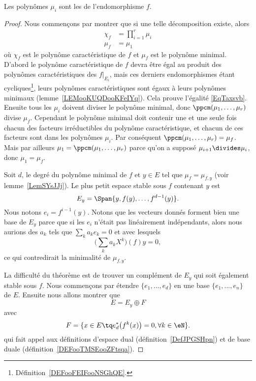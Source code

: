 Les polynômes \( \mu_i\) sont les  de l'endomorphisme \( f\).

\begin{proof}
	Nous commençons par montrer que si une telle décomposition existe, alors
	\begin{subequations}    \label{subEqzcGouz}
		\begin{align}
			\chi_f & =\prod_{i=1}^r\mu_i   \label{EqTaxsvb} \\
			\mu_f  & =\mu_1
		\end{align}
	\end{subequations}
	où \( \chi_f\) est le polynôme caractéristique de \( f\) et \( \mu_f\) est le polynôme minimal. D'abord le polynôme caractéristique de \( f\) devra être égal au produit des polynômes caractéristiques des \( f|_{E_i}\), mais ces derniers endomorphismes étant cycliques\footnote{Définition~\ref{DEFooFEIFooNSGhQE}.}, leurs polynômes caractéristiques sont égaux à leurs polynômes minimaux (lemme~\ref{LEMooKUQDooKFeIYq}). Cela prouve l'égalité \eqref{EqTaxsvb}. Ensuite tous les \( \mu_i\) doivent diviser le polynôme minimal, donc \( \ppcm(\mu_1,\ldots, \mu_r)\) divise \(\mu_f\). Cependant le polynôme minimal doit contenir une et une seule fois chacun des facteurs irréductibles du polynôme caractéristique, et chacun de ces facteurs sont dans les polynômes \( \mu_i\). Par conséquent \( \ppcm(\mu_1,\ldots, \mu_r)=\mu_f\). Mais par ailleurs \( \mu_1=\ppcm(\mu_1,\ldots, \mu_r)\) parce qu'on a supposé \( \mu_{i+1}\divides \mu_i\), donc \( \mu_1=\mu_f\).

	Soit \( d\), le degré du polynôme minimal de \( f\) et \( y\in E\) tel que \( \mu_f=\mu_{f,y}\) (voir lemme~\ref{LemSYsJJj}). Le plus petit espace stable sous \( f\) contenant \( y\) est
	\begin{equation}
		E_y=\Span\{ y,f(y),\ldots, f^{d-1}(y) \}.
	\end{equation}
	Nous notons \( e_i=f^{i-1}(y)\). Notons que les vecteurs donnés forment bien une base de \( E_y\) parce que si les \( e_i\) n'était pas linéairement indépendants, alors nous aurions des \( a_k\) tels que \( \sum_ka_ke_k=0\) et avec lesquels
	\begin{equation}
		\big( \sum_ka_kX^k \big)(f)y=0,
	\end{equation}
	ce qui contredirait la minimalité de \( \mu_{f,y}\).

	La difficulté du théorème est de trouver un complément de \( E_y\) qui soit également stable sous \( f\). Nous commençons par étendre \( \{ e_1,\ldots, e_d \}\) en une base \( \{ e_1,\ldots, e_n \}\) de \( E\). Ensuite nous allons montrer que
	\begin{equation}
		E=E_y\oplus F
	\end{equation}
	avec
	\begin{equation}
		F=\{ x\in E\tq  e^*_d\big( f^k(x) \big)=0, \forall k\in \eN \}.
	\end{equation}
	qui fait appel aux définitions d'espace dual (définition~\ref{DefJPGSHpn}) et de base duale (définition~\ref{DEFooTMSEooZFtsqa}).


\end{proof}
